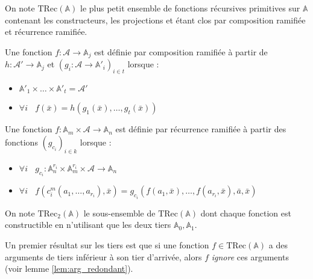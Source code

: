 \documentclass{report}
\newcommand{\bbA}{\mathbb{A}}
\newcommand{\TRec}[1]{\text{TRec}\left(\mathbb{#1}\right)}
\newcommand{\TRecd}[1]{\text{TRec}_{2}\left(\mathbb{#1}\right)}
\begin{document}
			\begin{definition} 
				\label{def:TRecA}
				On note $\TRec{A}$ le plus petit ensemble de fonctions récursives primitives sur $\bbA$ contenant les constructeurs, les projections et étant clos par composition ramifiée et récurrence ramifiée.
				
				\espace
				
				\hspace{0.1\linewidth}\parbox{0.9\linewidth}{
					\small
					Une fonction $f: \mathcal{A} \to \bbA_j$ est définie par composition ramifiée à partir de $h: \mathcal{A}' \to \bbA_j$ et $\left(g_i : \mathcal{A} \to \bbA'_i\right)_{i\in t}$ lorsque :
					
					\begin{itemize}
						\item	$\bbA'_1 \times \dots \times \bbA'_t = \mathcal{A}'$
						
						\item 	$\forall i \:\:\:\:
						f\left( \bar{x} \right) = h\left( g_1\left( \bar{x}\right), \dots,  g_t\left( \bar{x} \right) \right)
						$
					\end{itemize}
				}
				
				\espace
				
				\hspace{0.1\linewidth}\parbox{0.9\linewidth}{
					\small
					Une fonction $f: \bbA_m \times \mathcal{A} \to \bbA_n$ est définie par récurrence ramifiée à partir des fonctions $\left( g_{c_i} \right)_{i\in k}$ lorsque :
					
					\begin{itemize}
						\item 	$\forall i \:\:\:\: g_{c_i} : \bbA_n^{r_i} \times \bbA_m^{r_i} \times \mathcal{A} \to \bbA_n$
						
						\item 	$\forall i \:\:\:\:
						f(c_i^m(a_1, \dots, a_{r_i}), \bar{x}) 
						= g_{c_i}\left( f(a_1, \bar{x}), \dots, f(a_{r_i}, \bar{x}), \bar{a}, \bar{x} \right)
						$
					\end{itemize}
				}
				
				\espace
				
				On note $\TRecd{A}$ le sous-ensemble de $\TRec{A}$ dont chaque fonction est constructible en n'utilisant que les deux tiers $\bbA_0, \bbA_1$.
			\end{definition}
			
			Un premier résultat sur les tiers est que si une fonction $f \in \TRec{\bbA}$ a des arguments de tiers inférieur à son tier d'arrivée, alors $f$ \emph{ignore} ces arguments (voir lemme \ref{lem:arg_redondant}).
			
\end{document}
